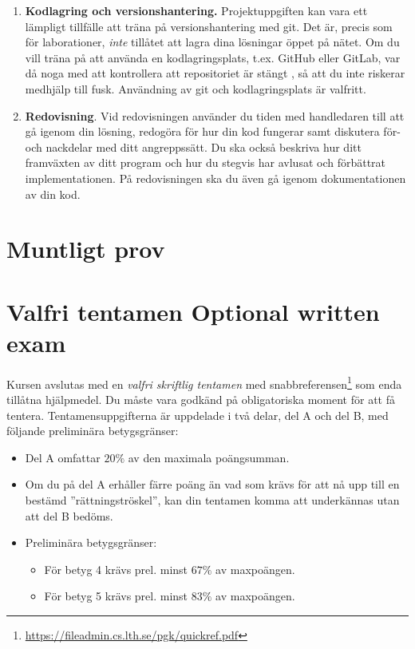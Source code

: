 \begin{enumerate}
\item \textbf{Kodlagring och versionshantering.} Projektuppgiften kan vara ett lämpligt tillfälle att träna på versionshantering med git. Det är, precis som för laborationer, \emph{inte} tillåtet att lagra dina lösningar öppet på nätet. Om du vill träna på att använda en kodlagringsplats, t.ex. GitHub eller GitLab, var då noga med att kontrollera att repositoriet är stängt , så att du inte riskerar medhjälp till fusk. Användning av git och kodlagringsplats är valfritt. 

\item \textbf{Redovisning}.
Vid redovisningen använder du tiden med handledaren till att gå igenom din lösning, redogöra för hur din kod fungerar samt diskutera för- och nackdelar med ditt angreppssätt. Du ska också beskriva hur ditt framväxten av ditt program och hur du stegvis har avlusat och förbättrat implementationen. På redovisningen ska du även gå igenom dokumentationen av din kod.

\end{enumerate}

\section{Muntligt prov}



\section{\ifswedish Valfri tentamen \else Optional written exam \fi}

Kursen avslutas med en \emph{valfri skriftlig tentamen} med snabbreferensen\footnote{\url{https://fileadmin.cs.lth.se/pgk/quickref.pdf}} som enda tillåtna hjälpmedel. Du måste vara godkänd på obligatoriska moment för att få tentera. Tentamensuppgifterna är uppdelade i två delar, del A och del B, med följande preliminära betygsgränser:

\begin{itemize}

\item Del A omfattar $20\%$ av den maximala poängsumman.
\item  Om du på del A erhåller färre poäng än vad som krävs för att nå upp till en bestämd ''rättningströskel'', kan din tentamen komma att underkännas utan att del B bedöms.
\item Preliminära betygsgränser:
\begin{itemize}
\item  För betyg 4 krävs prel. minst $67\%$ av maxpoängen.
\item  För betyg 5 krävs prel. minst $83\%$ av maxpoängen.
\end{itemize}
\end{itemize}
